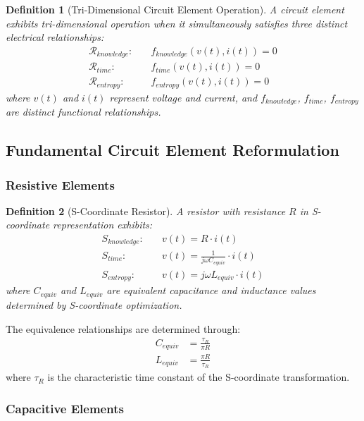 \documentclass[12pt,a4paper]{article}
\newtheorem{definition}{Definition}
\begin{document}
\begin{definition}[Tri-Dimensional Circuit Element Operation]
A circuit element exhibits tri-dimensional operation when it simultaneously satisfies three distinct electrical relationships:
\begin{align}
\mathcal{R}_{knowledge}: \quad &f_{knowledge}(v(t), i(t)) = 0 \\
\mathcal{R}_{time}: \quad &f_{time}(v(t), i(t)) = 0 \\
\mathcal{R}_{entropy}: \quad &f_{entropy}(v(t), i(t)) = 0
\end{align}
where $v(t)$ and $i(t)$ represent voltage and current, and $f_{knowledge}$, $f_{time}$, $f_{entropy}$ are distinct functional relationships.
\end{definition}

\subsection{Fundamental Circuit Element Reformulation}

\subsubsection{Resistive Elements}

\begin{definition}[S-Coordinate Resistor]
A resistor with resistance $R$ in S-coordinate representation exhibits:
\begin{align}
S_{knowledge}: \quad &v(t) = R \cdot i(t) \\
S_{time}: \quad &v(t) = \frac{1}{j\omega C_{equiv}} \cdot i(t) \\
S_{entropy}: \quad &v(t) = j\omega L_{equiv} \cdot i(t)
\end{align}
where $C_{equiv}$ and $L_{equiv}$ are equivalent capacitance and inductance values determined by S-coordinate optimization.
\end{definition}

The equivalence relationships are determined through:
\begin{align}
C_{equiv} &= \frac{\tau_R}{\pi R} \\
L_{equiv} &= \frac{\pi R}{\tau_R}
\end{align}
where $\tau_R$ is the characteristic time constant of the S-coordinate transformation.

\subsubsection{Capacitive Elements}
\end{document}
